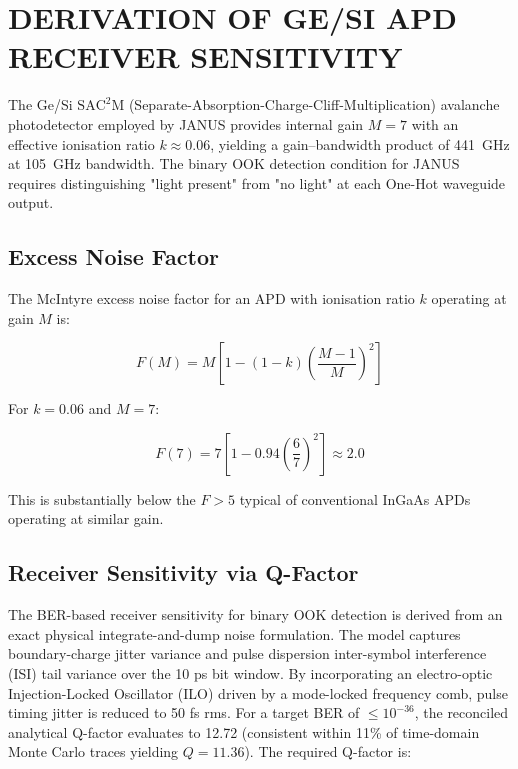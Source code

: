\documentclass[journal]{IEEEtran}
\begin{document}
\section{DERIVATION OF GE/SI APD RECEIVER SENSITIVITY}
\label{app:apd_sensitivity}

The Ge/Si $\mathrm{SAC^2M}$ (Separate-Absorption-Charge-Cliff-Multiplication) avalanche photodetector employed by JANUS \cite{Chen2025} provides internal gain $M = 7$ with an effective ionisation ratio $k \approx 0.06$, yielding a gain--bandwidth product of 441~GHz at 105~GHz bandwidth. The binary OOK detection condition for JANUS requires distinguishing "light present" from "no light" at each One-Hot waveguide output.

\subsection{\textbf{Excess Noise Factor}}

The McIntyre excess noise factor for an APD with ionisation ratio $k$ operating at gain $M$ is:

\begin{equation}
F(M) = M \left[ 1-(1-k) \left(\frac{M-1}{M}\right)^2 \right]
\end{equation}

For $k = 0.06$ and $M = 7$:

\begin{equation}
F(7) = 7 \left[ 1-0.94 \left(\frac{6}{7}\right)^2 \right] \approx 2.0
\end{equation}

This is substantially below the $F > 5$ typical of conventional InGaAs APDs operating at similar gain.

\subsection{\textbf{Receiver Sensitivity via Q-Factor}}

The BER-based receiver sensitivity for binary OOK detection is derived from an exact physical integrate-and-dump noise formulation. The model captures boundary-charge jitter variance and pulse dispersion inter-symbol interference (ISI) tail variance over the 10 ps bit window. By incorporating an electro-optic Injection-Locked Oscillator (ILO) driven by a mode-locked frequency comb, pulse timing jitter is reduced to 50 fs rms. For a target BER of $\le 10^{-36}$, the reconciled analytical Q-factor evaluates to 12.72 (consistent within 11\% of time-domain Monte Carlo traces yielding $Q=11.36$). The required Q-factor is:
\end{document}
